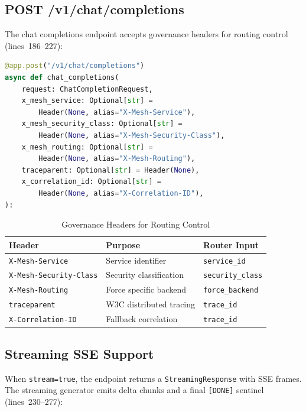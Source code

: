 \documentclass[11pt]{article}
\begin{document}
\subsection{POST /v1/chat/completions}

The chat completions endpoint accepts governance headers for routing control
(lines~186--227):

\begin{lstlisting}[language=Python,caption={Chat completions endpoint with governance headers (server.py, lines 186--194)},firstnumber=186]
@app.post("/v1/chat/completions")
async def chat_completions(
    request: ChatCompletionRequest,
    x_mesh_service: Optional[str] =
        Header(None, alias="X-Mesh-Service"),
    x_mesh_security_class: Optional[str] =
        Header(None, alias="X-Mesh-Security-Class"),
    x_mesh_routing: Optional[str] =
        Header(None, alias="X-Mesh-Routing"),
    traceparent: Optional[str] = Header(None),
    x_correlation_id: Optional[str] =
        Header(None, alias="X-Correlation-ID"),
):
\end{lstlisting}

\begin{table}[h]
\centering
\caption{Governance Headers for Routing Control}
\begin{tabular}{@{}lll@{}}
\toprule
\textbf{Header} & \textbf{Purpose} & \textbf{Router Input} \\
\midrule
\texttt{X-Mesh-Service} & Service identifier & \texttt{service\_id} \\
\texttt{X-Mesh-Security-Class} & Security classification & \texttt{security\_class} \\
\texttt{X-Mesh-Routing} & Force specific backend & \texttt{force\_backend} \\
\texttt{traceparent} & W3C distributed tracing & \texttt{trace\_id} \\
\texttt{X-Correlation-ID} & Fallback correlation & \texttt{trace\_id} \\
\bottomrule
\end{tabular}
\end{table}

\subsection{Streaming SSE Support}

When \texttt{stream=true}, the endpoint returns a \texttt{StreamingResponse}
with SSE frames. The streaming generator emits delta chunks and a final
\texttt{[DONE]} sentinel (lines~230--277):
\end{document}
